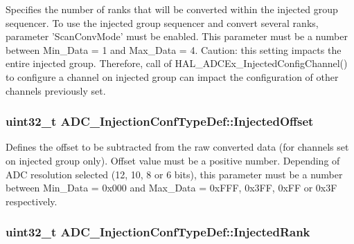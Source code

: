 Specifies the number of ranks that will be converted within the injected group sequencer. To use the injected group sequencer and convert several ranks, parameter 'Scan\-Conv\-Mode' must be enabled. This parameter must be a number between Min\-\_\-\-Data = 1 and Max\-\_\-\-Data = 4. Caution\-: this setting impacts the entire injected group. Therefore, call of H\-A\-L\-\_\-\-A\-D\-C\-Ex\-\_\-\-Injected\-Config\-Channel() to configure a channel on injected group can impact the configuration of other channels previously set. \hypertarget{struct_a_d_c___injection_conf_type_def_ac7d28d71ec3aec4d1587ee04fc585f09}{
\subsubsection[{Injected\-Offset}]{\setlength{\rightskip}{0pt plus 5cm}uint32\-\_\-t A\-D\-C\-\_\-\-Injection\-Conf\-Type\-Def\-::\-Injected\-Offset}}\label{struct_a_d_c___injection_conf_type_def_ac7d28d71ec3aec4d1587ee04fc585f09}
Defines the offset to be subtracted from the raw converted data (for channels set on injected group only). Offset value must be a positive number. Depending of A\-D\-C resolution selected (12, 10, 8 or 6 bits), this parameter must be a number between Min\-\_\-\-Data = 0x000 and Max\-\_\-\-Data = 0x\-F\-F\-F, 0x3\-F\-F, 0x\-F\-F or 0x3\-F respectively. \hypertarget{struct_a_d_c___injection_conf_type_def_af8a1717c0f5a5d0c7a705224f28a844f}{
\subsubsection[{Injected\-Rank}]{\setlength{\rightskip}{0pt plus 5cm}uint32\-\_\-t A\-D\-C\-\_\-\-Injection\-Conf\-Type\-Def\-::\-Injected\-Rank}}\label{struct_a_d_c___injection_conf_type_def_af8a1717c0f5a5d0c7a705224f28a844f}

